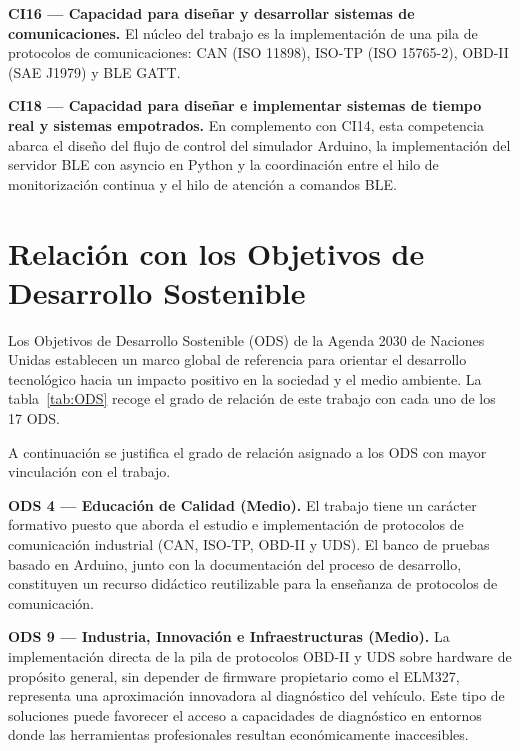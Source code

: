 \textbf{CI16 — Capacidad para diseñar y desarrollar sistemas de comunicaciones.} El núcleo del trabajo es la implementación de una pila de protocolos de comunicaciones: CAN (ISO 11898), ISO-TP (ISO 15765-2), OBD-II (SAE J1979) y BLE GATT.

\textbf{CI18 — Capacidad para diseñar e implementar sistemas de tiempo real y sistemas empotrados.} En complemento con CI14, esta competencia abarca el diseño del flujo de control del simulador Arduino, la implementación del servidor BLE con asyncio en Python y la coordinación entre el hilo de monitorización continua y el hilo de atención a comandos BLE.


\section{Relación con los Objetivos de Desarrollo Sostenible}

Los Objetivos de Desarrollo Sostenible (ODS) de la Agenda 2030 de Naciones Unidas establecen un marco global de referencia para orientar el desarrollo tecnológico hacia un impacto positivo en la sociedad y el medio ambiente. La tabla~\ref{tab:ODS} recoge el grado de relación de este trabajo con cada uno de los 17 ODS.

\begin{table}[!htbp]
\caption{Grado de relación de este trabajo con los 17 Objetivos de Desarrollo Sostenible (ODS) de la Agenda 2030.}
\label{tab:ODS}

\end{table}

A continuación se justifica el grado de relación asignado a los ODS con mayor vinculación con el trabajo.

\textbf{ODS 4 — Educación de Calidad (Medio).} El trabajo tiene un carácter formativo puesto que aborda el estudio e implementación de protocolos de comunicación industrial (CAN, ISO-TP, OBD-II y UDS). El banco de pruebas basado en Arduino, junto con la documentación del proceso de desarrollo, constituyen un recurso didáctico reutilizable para la enseñanza de protocolos de comunicación.

\textbf{ODS 9 — Industria, Innovación e Infraestructuras (Medio).} La implementación directa de la pila de protocolos OBD-II y UDS sobre hardware de propósito general, sin depender de firmware propietario como el ELM327, representa una aproximación innovadora al diagnóstico del vehículo. Este tipo de soluciones puede favorecer el acceso a capacidades de diagnóstico en entornos donde las herramientas profesionales resultan económicamente inaccesibles.

